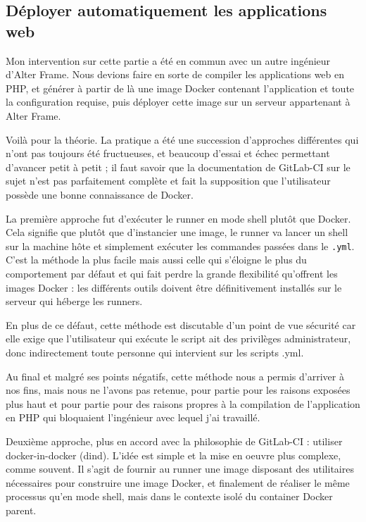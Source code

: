 \subsection{Déployer automatiquement les applications web}
Mon intervention sur cette partie a été en commun avec un autre ingénieur d'Alter Frame. Nous devions faire en sorte de compiler les applications web en PHP, et générer à partir de là une image Docker contenant l'application et toute la configuration requise, puis  déployer cette image sur un serveur appartenant à Alter Frame.

Voilà pour la théorie. La pratique a été une succession d'approches différentes qui n'ont pas toujours été fructueuses, et beaucoup d'essai et échec permettant d'avancer petit à petit ; il faut savoir que la documentation de GitLab-CI sur le sujet\cite{gitlab_docker_build} n'est pas parfaitement complète et fait la supposition que l'utilisateur possède une bonne connaissance de Docker.

La première approche fut d'exécuter le runner en mode shell plutôt que Docker. Cela signifie que plutôt que d'instancier une image, le runner va lancer un shell sur la machine hôte et simplement exécuter les commandes passées dans le \verb|.yml|. C'est la méthode la plus facile mais aussi celle qui s'éloigne le plus du comportement par défaut et qui fait perdre la grande flexibilité qu'offrent les images Docker : les différents outils doivent être définitivement installés sur le serveur qui héberge les runners.

En plus de ce défaut, cette méthode est discutable d'un point de vue sécurité car elle exige que l'utilisateur qui exécute le script ait des privilèges administrateur, donc indirectement toute personne qui intervient sur les scripts .yml\cite{docker_sec}.

Au final et malgré ses points négatifs, cette méthode nous a permis d'arriver à nos fins, mais nous ne l'avons pas retenue, pour partie pour les raisons exposées plus haut et pour partie pour des raisons propres à la compilation de l'application en PHP qui bloquaient l'ingénieur avec lequel j'ai travaillé.

Deuxième approche, plus en accord avec la philosophie de GitLab-CI : utiliser docker-in-docker (dind). L'idée est simple et la mise en oeuvre plus complexe, comme souvent. Il s'agit de fournir au runner une image disposant des utilitaires nécessaires pour construire une image Docker, et finalement de réaliser le même processus qu'en mode shell, mais dans le contexte isolé du container Docker parent.

